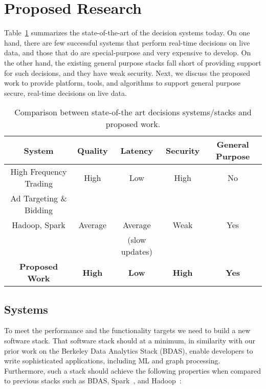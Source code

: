 \section{Proposed Research}

Table~\ref{table:new-work} summarizes the state-of-the-art of the decision systems today. On one hand, there are few successful systems that perform real-time decisions on live data, and those that do are special-purpose and very expensive to develop. On the other hand, the existing general purpose stacks fall short of providing support for such decisions, and they have weak security. Next, we discuss the proposed work to provide platform, tools, and algorithms to support general purpose secure, real-time decisions on live data.  


\begin{table}[h]
\begin{center}
{\small
\begin{tabular}{ |c|c|c|c|c| } 
 \hline
{\bf System} & {\bf Quality} & {\bf Latency} & {\bf Security} & {\bf General Purpose}\\\hline 
High Frequency Trading & High & Low & High & No \\
Ad Targeting \& Bidding & & & & \\\hline
Hadoop, Spark & Average & Average & Weak & Yes\\
                         &               & (slow updates) & & \\\hline
{\bf Proposed Work} & {\bf High} & {\bf Low} & {\bf High} & {\bf Yes} \\\hline
\end{tabular}
}
\end{center}
\vskip -0.15in
\caption{\small{Comparison between state-of-the art decisions systems/stacks and proposed work.}}
\label{table:new-work}
\end{table}


\subsection{Systems}

To meet the performance and the functionality targets we need to build a new software stack. That software stack should at a minimum, in similarity with our prior work on the Berkeley Data Analytics Stack (BDAS), enable developers to write sophisticated applications, including ML and graph processing. Furthermore, such a stack should achieve the following properties when compared to previous stacks such as BDAS, Spark~\cite{spark}, and Hadoop~\cite{murthy2011architecture}:

